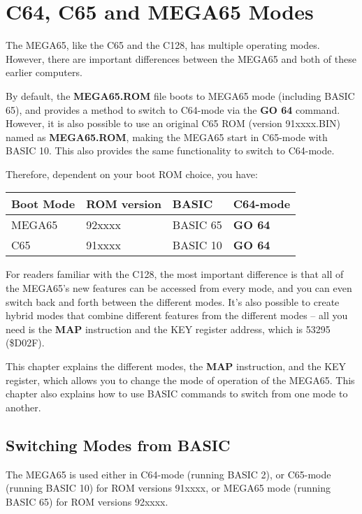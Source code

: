 \chapter {C64, C65 and MEGA65 Modes}
\label{cha:modes}

The MEGA65, like the C65 and the C128, has multiple operating modes.
However, there are important differences between the MEGA65 and both
of these earlier computers.

By default, the {\bf MEGA65.ROM} file boots to MEGA65 mode
(including BASIC 65), and
provides a method to switch to C64-mode via the {\bf GO 64} command.
However, it is also possible to use an original C65 ROM (version 91xxxx.BIN)
named as {\bf MEGA65.ROM}, making the MEGA65 start in C65-mode
with BASIC 10. This also provides the same functionality to switch to C64-mode.

Therefore, dependent on your boot ROM choice, you have:

\begin{center}
\begin{tabular}{|l|l|l|l|}
\hline
Boot Mode & ROM version & BASIC & C64-mode \\
\hline
MEGA65    & 92xxxx      & BASIC 65 & {\bf GO 64} \\
C65       & 91xxxx      & BASIC 10 & {\bf GO 64} \\
\hline
\end{tabular}
\end{center}
For readers familiar with the C128,
the most important difference is that all of the MEGA65's new features
can be accessed from every mode, and you can even switch back and forth
between the different modes. It's also possible to create hybrid modes that combine different
features from the different modes -- all you need is the {\bf MAP} instruction and the KEY register address,
which is 53295 (\$D02F).

This chapter explains the different modes, the {\bf MAP} instruction, and
the KEY register, which allows you to change the mode of operation of the MEGA65.
This chapter also explains how to use BASIC commands to switch from one mode to another.

\section{Switching Modes from BASIC}

The MEGA65 is used either
in C64-mode (running BASIC 2),
or C65-mode (running BASIC 10) for ROM versions 91xxxx,
or MEGA65 mode (running BASIC 65) for ROM versions 92xxxx.

